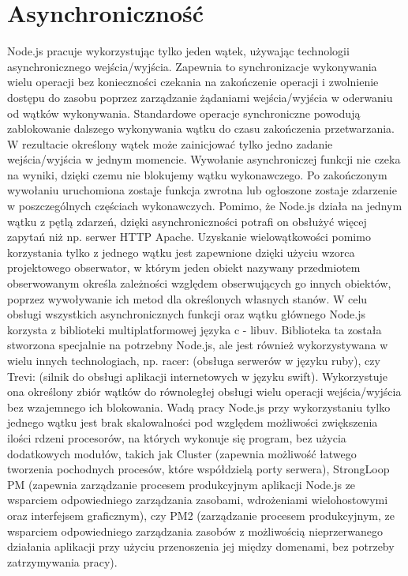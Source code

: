 \documentclass[12pt]{report}
\begin{document}
\section{Asynchroniczność}
Node.js pracuje wykorzystując tylko jeden wątek, używając technologii asynchronicznego wejścia/wyjścia. 
Zapewnia to synchronizacje wykonywania wielu operacji bez konieczności czekania na zakończenie operacji i zwolnienie dostępu do zasobu poprzez zarządzanie żądaniami wejścia/wyjścia w oderwaniu od wątków wykonywania. 
Standardowe operacje synchroniczne powodują zablokowanie dalszego wykonywania wątku do czasu zakończenia przetwarzania. 
W rezultacie określony wątek może zainicjować tylko jedno zadanie wejścia/wyjścia w jednym momencie. 
Wywołanie asynchroniczej funkcji nie czeka na wyniki, dzięki czemu nie blokujemy wątku wykonawczego. 
Po zakończonym wywołaniu uruchomiona zostaje funkcja zwrotna lub ogłoszone zostaje zdarzenie w poszczególnych częściach wykonawczych. 
Pomimo, że Node.js działa na jednym wątku z pętlą zdarzeń, dzięki asynchroniczności potrafi on obsłużyć więcej zapytań niż np. serwer HTTP Apache. 
Uzyskanie wielowątkowości pomimo korzystania tylko z jednego wątku jest zapewnione dzięki użyciu wzorca projektowego obserwator, w którym jeden obiekt nazywany przedmiotem obserwowanym określa zależności względem obserwujących go innych obiektów, poprzez wywoływanie ich metod dla określonych własnych stanów. 
W celu obsługi wszystkich asynchronicznych funkcji oraz wątku głównego Node.js korzysta z biblioteki multiplatformowej języka c - libuv. 
Biblioteka ta została stworzona specjalnie na potrzebny Node.js, ale jest również wykorzystywana w wielu innych technologiach, np. racer: (obsługa serwerów w języku ruby), czy Trevi: (silnik do obsługi aplikacji internetowych w języku swift). 
Wykorzystuje ona określony zbiór wątków do równoległej obsługi wielu operacji wejścia/wyjścia bez wzajemnego ich blokowania. 
Wadą pracy Node.js przy wykorzystaniu tylko jednego wątku jest brak skalowalności pod względem możliwości zwiększenia ilości rdzeni procesorów, na których wykonuje się program, bez użycia dodatkowych modułów, takich jak Cluster (zapewnia możliwość łatwego tworzenia pochodnych procesów, które współdzielą porty serwera), StrongLoop PM (zapewnia zarządzanie procesem produkcyjnym aplikacji Node.js ze wsparciem odpowiedniego zarządzania zasobami, wdrożeniami wielohostowymi oraz interfejsem graficznym), czy PM2 (zarządzanie procesem produkcyjnym, ze wsparciem odpowiedniego zarządzania zasobów z możliwością nieprzerwanego działania aplikacji przy użyciu przenoszenia jej między domenami, bez potrzeby zatrzymywania pracy). 
\end{document}
